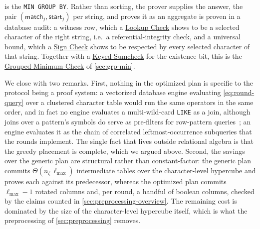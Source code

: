   is the \texttt{MIN GROUP BY}. Rather than sorting, the prover supplies the answer, the pair $(\mathsf{match}_j,\mathsf{start}_j)$ per string, and proves it as an aggregate is proven in a database audit: a witness row, which a \hyperref[{piop:lookup-check}]{Lookup Check} shows to be a selected character of the right string, i.e.\ a referential-integrity check, and a universal bound, which a \hyperref[{piop:sign-check}]{Sign Check} shows to be respected by every selected character of that string. Together with a \hyperref[{piop:keyedsumcheck}]{Keyed Sumcheck} for the existence bit, this is the \hyperref[{piop:grp-min}]{Grouped Minimum Check} of \cref{sec:grp-min}.

We close with two remarks. First, nothing in the optimized plan is specific to the protocol being a proof system: a vectorized database engine evaluating \cref{eq:round-query} over a clustered character table would run the same operators in the same order, and in fact no engine evaluates a multi-wild-card \texttt{LIKE} as a join, although joins over a pattern's symbols do serve as pre-filters for row-pattern queries~\cite{ZhuHC23}; an engine evaluates it as the chain of correlated leftmost-occurrence subqueries that the rounds implement. The single fact that lives outside relational algebra is that the greedy placement is complete, which we argued above. Second, the savings over the generic plan are structural rather than constant-factor: the generic plan commits $\Theta(n_\zeta\,\ell_{\max})$ intermediate tables over the character-level hypercube and proves each against its predecessor, whereas the optimized plan commits $\ell_{\max}-1$ rotated columns and, per round, a handful of boolean columns, checked by the claims counted in \cref{sec:preprocessing-overview}. The remaining cost is dominated by the size of the character-level hypercube itself, which is what the preprocessing of \cref{sec:preprocessing} removes.
